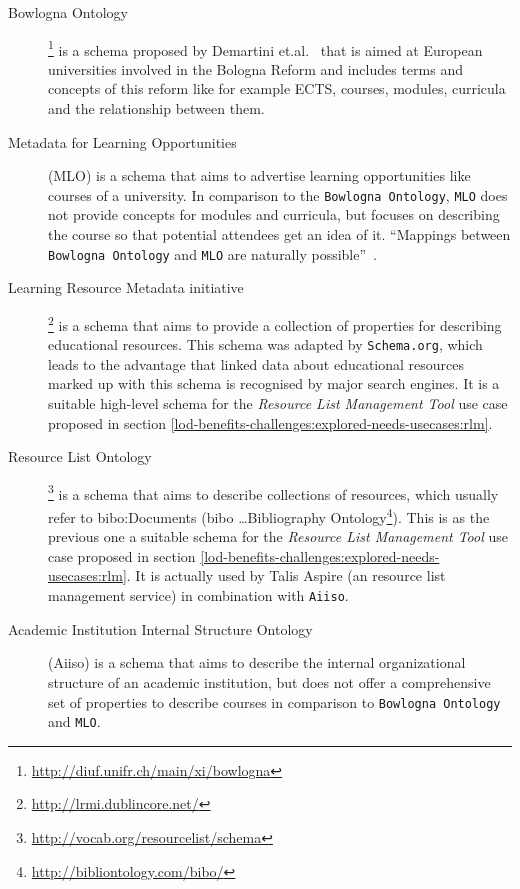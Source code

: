 \documentclass{article}
\begin{document}
\begin{description}
	\item[Bowlogna Ontology]\footnote{\url{http://diuf.unifr.ch/main/xi/bowlogna}} is a schema proposed by Demartini et.al.~\cite{demartini_bowlogna_2013} that is aimed at European universities involved in the Bologna Reform and includes terms and concepts of this reform like for example ECTS, courses, modules, curricula and the relationship between them.
	\item[Metadata for Learning Opportunities] (MLO) is a schema that aims to advertise learning opportunities like courses of a university. In comparison to the \texttt{Bowlogna Ontology}, \texttt{MLO} does not provide concepts for modules and curricula, but focuses on describing the course so that potential attendees get an idea of it. \enquote{Mappings between \texttt{Bowlogna Ontology} and \texttt{MLO} are naturally possible}~\cite{demartini_bowlogna_2013}.
	
	\item[Learning Resource Metadata initiative]\footnote{\url{http://lrmi.dublincore.net/}} is a schema that aims to provide a collection of properties for describing educational resources. This schema was adapted by \texttt{Schema.org}, which leads to the advantage that linked data about educational resources marked up with this schema is recognised by major search engines. It is a suitable high-level schema for the \textit{Resource List Management Tool} use case proposed in section \ref{lod-benefits-challenges:explored-needs-usecases:rlm}.
	
	\item[Resource List Ontology]\footnote{\url{http://vocab.org/resourcelist/schema}} is a schema that aims to describe collections of resources, which usually refer to bibo:Documents (bibo \dots{Bibliography Ontology\footnote{\url{http://bibliontology.com/bibo/}}}). This is as the previous one a suitable schema for the \textit{Resource List Management Tool} use case proposed in section \ref{lod-benefits-challenges:explored-needs-usecases:rlm}. It is actually used by Talis Aspire (an resource list management service) in combination with \texttt{Aiiso}.
	
	\item[Academic Institution Internal Structure Ontology] (Aiiso) is a schema that aims to describe the internal organizational structure of an academic institution, but does not offer a comprehensive set of properties to describe courses in comparison to \texttt{Bowlogna Ontology} and \texttt{MLO}.
\end{description}
\end{document}
